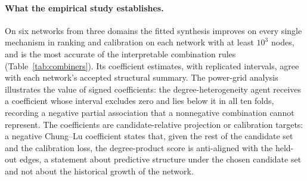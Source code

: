 \documentclass[12pt]{article}
\newcommand{\1}{\mathbf{1}}
\begin{document}
\paragraph{What the empirical study establishes.}
On six networks from three domains the fitted synthesis improves on every single mechanism in ranking
and calibration on each network with at least $10^3$ nodes, and is the most accurate of the
interpretable combination rules (Table~\ref{tab:combiners}). Its coefficient estimates, with
replicated intervals, agree with each network's accepted structural summary. The power-grid analysis
illustrates the value of signed coefficients: the degree-heterogeneity agent receives a coefficient
whose interval excludes zero and lies below it in all ten folds, recording a negative partial
association that a nonnegative combination cannot represent. The coefficients are candidate-relative projection or calibration targets: a negative Chung--Lu coefficient
states that, given the rest of the candidate set and the calibration loss, the degree-product score is
anti-aligned with the held-out edges, a statement about predictive structure under the chosen candidate set
and not about the historical growth of the network.
\end{document}
